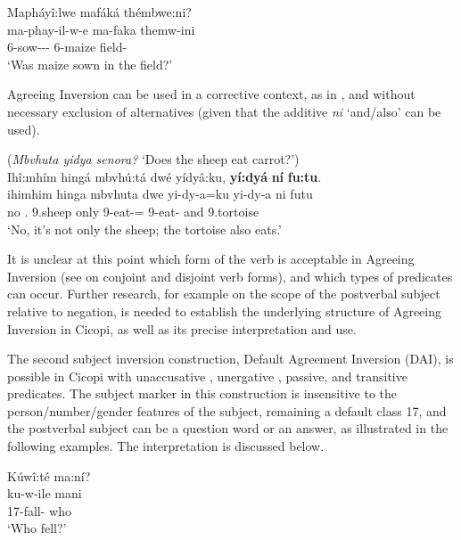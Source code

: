 \documentclass[output=paper]{langscibook}
\begin{document}
\ea
\label{bkm:Ref120691553}
Mapháyî:lwe mafáká thémbwe:ni?\\
\gll
ma-phay-il-w-e  ma-faka  themw-ini\\
6\SM{}-sow-\APPL{}-\PASS{}-\PFV{}  6-maize  field-\LOC{}\\
\glt
‘Was maize sown in the field?’\\

\z

Agreeing Inversion can be used in a corrective context, as in , and without necessary exclusion of alternatives (given that the additive \textit{ni} `and/also' can be used).\largerpage[-1]\pagebreak

\ea
\label{bkm:Ref146271618}
(\textit{Mbvhuta yidya senora?} `Does the sheep eat carrot?')\\
Ihî:mhím hingá mbvhú:tá dwé yídyâ:ku, \textbf{yí:dyá} \textbf{ní} \textbf{fu:tu}.\\
\gll
ihimhim  hinga  mbvhuta  dwe  yi-dy-a=ku  yi-dy-a  ni  futu\\
no  \COP.\NEG{}  9.sheep  only  9\SM{}-eat-\FV=\REL{}  9\SM{}-eat-\FV{}  and  9.tortoise\\
\glt
‘No, it’s not only the sheep; the tortoise also eats.’\\

\z

It is unclear at this point which form of the verb is acceptable in Agreeing Inversion (see  on conjoint and disjoint verb forms), and which types of predicates can occur. Further research, for example on the scope of the postverbal subject relative to negation, is needed to establish the underlying structure of Agreeing Inversion in Cicopi, as well as its precise interpretation and use.

The second subject inversion construction, Default Agreement Inversion (DAI), is possible in Cicopi with unaccusative , unergative , passive, and transitive  predicates. The subject marker in this construction is insensitive to the person/number/gender features of the subject, remaining a default class 17, and the postverbal subject can be a question word or an answer, as illustrated in the following examples. The interpretation is discussed below.

\ea\label{bkm:Ref127259247}
\ea
Kúwî:té ma:ní?\\
\gll
ku-w-ile   mani\\
17\SM{}-fall-\PFV{}  who\\
\glt
‘Who fell?’\\
\end{document}
